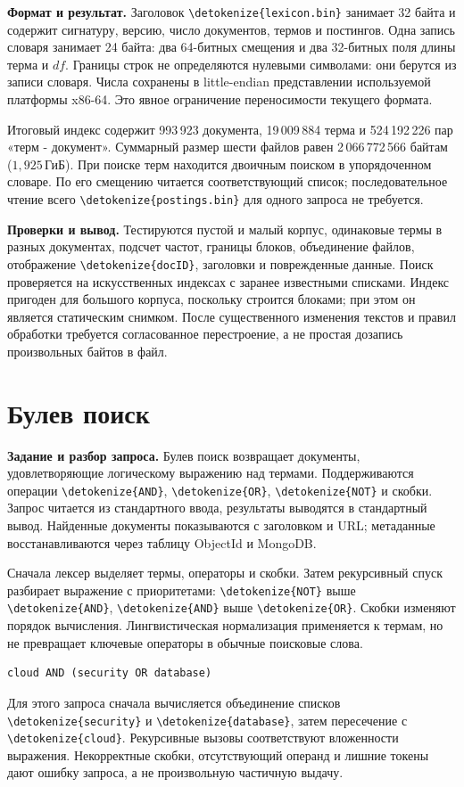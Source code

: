 \documentclass[pdf,unicode,12pt,a4paper,oneside,fleqn]{article}
\newcommand{\labsection}[2]{\par\Needspace{9\baselineskip}\setcounter{section}{\numexpr#1-1\relax}\section{#2}}
\newcommand{\partlabel}[1]{\par\Needspace{4\baselineskip}\medskip\textbf{#1.}\quad}
\DeclareRobustCommand{\code}[1]{\expandafter\nolinkurl\expandafter{\detokenize{#1}}}
\newcommand{\GiB}{\,\text{ГиБ}}
\begin{document}
\partlabel{Формат и результат}
Заголовок \code{lexicon.bin} занимает 32 байта и содержит сигнатуру,
версию, число документов, термов и постингов. Одна запись словаря занимает
24 байта: два 64-битных смещения и два 32-битных поля длины терма и $df$.
Границы строк не определяются нулевыми символами: они берутся из записи словаря.
Числа сохранены в little-endian представлении используемой платформы x86-64.
Это явное ограничение переносимости текущего формата.

Итоговый индекс содержит 993\,923 документа, 19\,009\,884 терма
и 524\,192\,226 пар «терм - документ». Суммарный размер шести файлов
равен 2\,066\,772\,566 байтам ($1{,}925\GiB$). При поиске терм
находится двоичным поиском в упорядоченном словаре. По его смещению читается
соответствующий список; последовательное чтение всего \code{postings.bin}
для одного запроса не требуется.

\partlabel{Проверки и вывод}
Тестируются пустой и малый корпус, одинаковые термы в разных документах,
подсчет частот, границы блоков, объединение файлов, отображение \code{docID},
заголовки и поврежденные данные. Поиск проверяется на искусственных индексах
с заранее известными списками. Индекс пригоден для большого корпуса,
поскольку строится блоками; при этом он является статическим снимком.
После существенного изменения текстов и правил обработки требуется
согласованное перестроение, а не простая дозапись произвольных байтов в файл.

\labsection{8}{Булев поиск}

\partlabel{Задание и разбор запроса}
Булев поиск возвращает документы, удовлетворяющие логическому выражению
над термами. Поддерживаются операции \code{AND}, \code{OR}, \code{NOT}
и скобки. Запрос читается из стандартного ввода, результаты выводятся
в стандартный вывод. Найденные документы показываются с заголовком и URL;
метаданные восстанавливаются через таблицу ObjectId и MongoDB.

Сначала лексер выделяет термы, операторы и скобки. Затем рекурсивный спуск
разбирает выражение с приоритетами: \code{NOT} выше \code{AND},
\code{AND} выше \code{OR}. Скобки изменяют порядок вычисления.
Лингвистическая нормализация применяется к термам, но не превращает ключевые
операторы в обычные поисковые слова.

\begin{lstlisting}
cloud AND (security OR database)
\end{lstlisting}

Для этого запроса сначала вычисляется объединение списков \code{security}
и \code{database}, затем пересечение с \code{cloud}. Рекурсивные вызовы
соответствуют вложенности выражения. Некорректные скобки, отсутствующий операнд
и лишние токены дают ошибку запроса, а не произвольную частичную выдачу.
\end{document}
